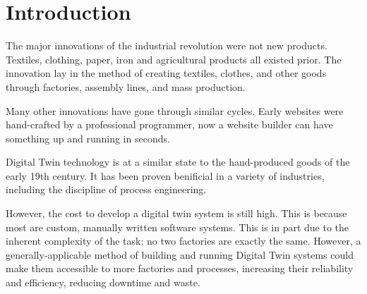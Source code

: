 \section{Introduction}

The major innovations of the industrial revolution were not new products. Textiles, clothing, paper, iron and agricultural products all existed prior. The innovation lay in the method of creating textiles, clothes, and other goods through factories, assembly lines, and mass production.

Many other innovations have gone through similar cycles. Early websites were hand-crafted by a professional programmer, now a website builder can have something up and running in seconds.

Digital Twin technology is at a similar state to the hand-produced goods of the early 19th century. It has been proven benificial in a variety of industries, including the discipline of process engineering. 

However, the cost to develop a digital twin system is still high. This is because most are custom, manually written software systems. This is in part due to the inherent complexity of the task; no two factories are exactly the same. However, a generally-applicable method of building and running Digital Twin systems could make them accessible to more factories and processes, increasing their reliability and efficiency, reducing downtime and waste.
